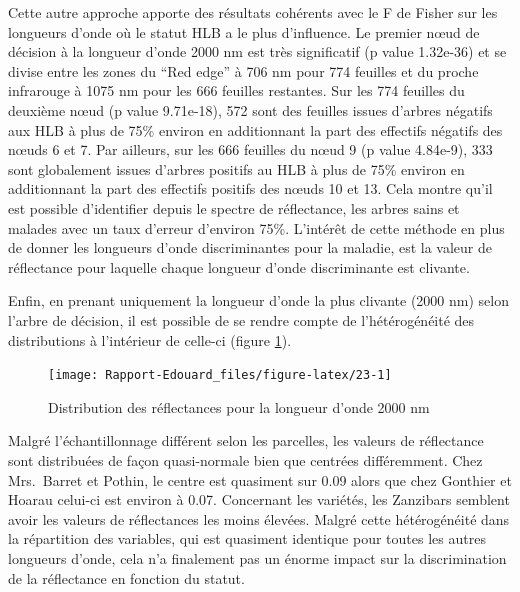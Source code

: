 \documentclass[
  11pt,
  french,
  a4paper,
  extrafontsizes,onecolumn,openright
  ]{memoir}
\begin{document}
Cette autre approche apporte des résultats cohérents avec le F de Fisher sur les longueurs d'onde où le statut HLB a le plus d'influence. Le premier nœud de décision à la longueur d'onde 2000 nm est très significatif (p value 1.32e-36) et se divise entre les zones du ``Red edge'' à 706 nm pour 774 feuilles et du proche infrarouge à 1075 nm pour les 666 feuilles restantes. Sur les 774 feuilles du deuxième nœud (p value 9.71e-18), 572 sont des feuilles issues d'arbres négatifs aux HLB à plus de 75\% environ en additionnant la part des effectifs négatifs des nœuds 6 et 7. Par ailleurs, sur les 666 feuilles du nœud 9 (p value 4.84e-9), 333 sont globalement issues d'arbres positifs au HLB à plus de 75\% environ en additionnant la part des effectifs positifs des nœuds 10 et 13. Cela montre qu'il est possible d'identifier depuis le spectre de réflectance, les arbres sains et malades avec un taux d'erreur d'environ 75\%.
L'intérêt de cette méthode en plus de donner les longueurs d'onde discriminantes pour la maladie, est la valeur de réflectance pour laquelle chaque longueur d'onde discriminante est clivante.

Enfin, en prenant uniquement la longueur d'onde la plus clivante (2000 nm) selon l'arbre de décision, il est possible de se rendre compte de l'hétérogénéité des distributions à l'intérieur de celle-ci (figure \ref{fig:23}).

\scriptsize

\begin{figure}

{\centering \texttt{[image: Rapport-Edouard\_files/figure-latex/23-1]} 

}

\caption{Distribution des réflectances pour la longueur d’onde 2000 nm}\label{fig:23}
\end{figure}

\normalsize

\vfill
\newpage

Malgré l'échantillonnage différent selon les parcelles, les valeurs de réflectance sont distribuées de façon quasi-normale bien que centrées différemment. Chez Mrs.~Barret et Pothin, le centre est quasiment sur 0.09 alors que chez Gonthier et Hoarau celui-ci est environ à 0.07. Concernant les variétés, les Zanzibars semblent avoir les valeurs de réflectances les moins élevées. Malgré cette hétérogénéité dans la répartition des variables, qui est quasiment identique pour toutes les autres longueurs d'onde, cela n'a finalement pas un énorme impact sur la discrimination de la réflectance en fonction du statut.
\end{document}
